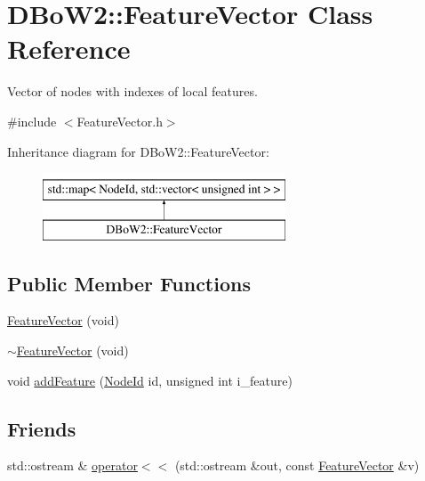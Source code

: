 \hypertarget{class_d_bo_w2_1_1_feature_vector}{}\section{D\+Bo\+W2\+:\+:Feature\+Vector Class Reference}
\label{class_d_bo_w2_1_1_feature_vector}


Vector of nodes with indexes of local features.  




{\ttfamily \#include $<$Feature\+Vector.\+h$>$}

Inheritance diagram for D\+Bo\+W2\+:\+:Feature\+Vector\+:\begin{figure}[H]
\begin{center}
\leavevmode
\includegraphics[height=2.000000cm]{class_d_bo_w2_1_1_feature_vector}
\end{center}
\end{figure}
\subsection*{Public Member Functions}
\begin{DoxyCompactItemize}
\item 
\mbox{\hyperlink{class_d_bo_w2_1_1_feature_vector_a66c069d269c8c98dcf3ae39cbc6f861b}{Feature\+Vector}} (void)
\item 
\mbox{\hyperlink{class_d_bo_w2_1_1_feature_vector_a44514a020719b7e5ac552332a9922bd9}{$\sim$\+Feature\+Vector}} (void)
\item 
void \mbox{\hyperlink{class_d_bo_w2_1_1_feature_vector_ae9554bfcbebc85439616de08f47f2238}{add\+Feature}} (\mbox{\hyperlink{namespace_d_bo_w2_a3a0fa9c50c0df508759362d6204566f2}{Node\+Id}} id, unsigned int i\+\_\+feature)
\end{DoxyCompactItemize}
\subsection*{Friends}
\begin{DoxyCompactItemize}
\item 
std\+::ostream \& \mbox{\hyperlink{class_d_bo_w2_1_1_feature_vector_a34aa65c93dc5f6be269610e3f238d9b1}{operator$<$$<$}} (std\+::ostream \&out, const \mbox{\hyperlink{class_d_bo_w2_1_1_feature_vector}{Feature\+Vector}} \&v)
\end{DoxyCompactItemize}


